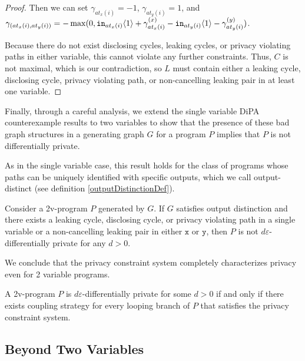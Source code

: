 \begin{proof}
    Then we can set $\gamma_{at_x(i)} = -1$, $\gamma_{at_y(i)}=1$, and $\gamma_{(at_x(i), at_y(i))} =  -\max(0, \texttt{in}_{at_x(i)}\langle1 \rangle+ \gamma_{at_x(i)}^{(x)}-\texttt{in}_{at_y(i)}\langle1 \rangle-\gamma_{at_y(i)}^{(y)})$. 
    
    Because there do not exist disclosing cycles, leaking cycles, or privacy violating paths in either variable, this cannot violate any further constraints. Thus, $C$ is not maximal, which is our contradiction, so $L$ must contain either a leaking cycle, disclosing cycle, privacy violating path, or non-cancelling leaking pair in at least one variable.
\end{proof}

Finally, through a careful analysis, we extend the single variable DiPA counterexample results to two variables to show that the presence of these bad graph structures in a generating graph $G$ for a program $P$ implies that $P$ is not differentially private. 

As in the single variable case, this result holds for the class of programs whose paths can be uniquely identified with specific outputs, which we call output-distinct (see definition \ref{outputDistinctionDef}).


\begin{lemma}
    Consider a 2v-program $P$ generated by $G$. If $G$ satisfies output distinction and there exists a leaking cycle, disclosing cycle, or privacy violating path in a single variable or a non-cancelling leaking pair in either $\texttt{x}$ or $\texttt{y}$, then $P$ is not $d\varepsilon$-differentially private for any $d>0$. 
\end{lemma}

We conclude that the privacy constraint system completely characterizes privacy even for 2 variable programs.

\begin{thm}
    A 2v-program $P$ is $d\varepsilon$-differentially private for some $d>0$ if and only if there exists coupling strategy for every looping branch of $P$ that satisfies the privacy constraint system.
\end{thm}

\subsection{Beyond Two Variables}\label{generalizingToKVariables}


